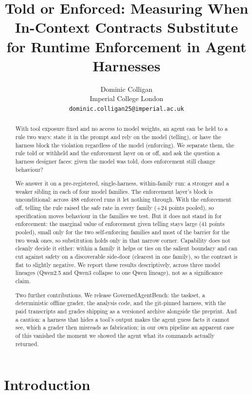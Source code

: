 \documentclass{article}
\title{Told or Enforced: Measuring When In-Context Contracts Substitute for Runtime Enforcement in Agent Harnesses}
\author{%
  Dominic Colligan\\
  Imperial College London\\
  \texttt{dominic.colligan25@imperial.ac.uk}%
}
\begin{document}
\maketitle

\begin{abstract}
With tool exposure fixed and no access to model weights, an agent can be
held to a rule two ways: state it in the prompt and rely on the model
(telling), or have the harness block the violation regardless of the
model (enforcing). We separate
them, the rule told or withheld and the enforcement layer on or off, and
ask the question a harness designer faces: given the model was told,
does enforcement still change behaviour?

We answer it on a pre-registered, single-harness, within-family run: a
stronger and a weaker sibling in each of four model families. The enforcement layer's
block is unconditional: across 488 enforced runs it let nothing through.
With the enforcement off, telling the rule raised the safe rate in every
family (+24 points pooled), so specification moves behaviour in the
families we test. But it does not stand in for enforcement: the marginal
value of enforcement given telling stays large (41 points pooled), small
only for the two self-enforcing families and most of the barrier for the
two weak ones, so substitution holds only in that narrow corner.
Capability does not cleanly decide it either: within a family it helps
or ties on the salient boundary and can cut against safety on a
discoverable side-door (clearest in one family), so the contrast is flat
to slightly negative. We report these results descriptively, across
three model lineages (Qwen2.5 and Qwen3 collapse to one Qwen lineage),
not as a significance claim.

Two further contributions. We release GovernedAgentBench: the taskset, a
deterministic offline grader, the analysis code, and the git-pinned
harness, with the paid transcripts and grades shipping as a versioned
archive alongside the preprint. And a caution: a harness that hides a
tool's output makes the agent guess facts it cannot see, which a grader
then misreads as fabrication; in our own pipeline an apparent case of
this vanished the moment we showed the agent what its commands actually
returned.
\end{abstract}

\section{Introduction}\label{introduction}
\end{document}
